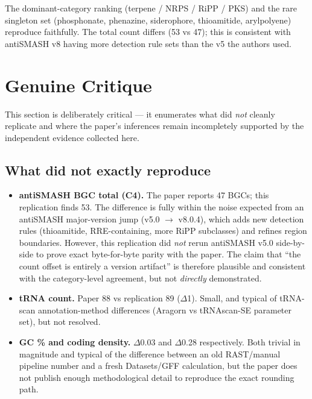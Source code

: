 \documentclass[11pt,a4paper]{article}
\begin{document}
The dominant-category ranking (terpene / NRPS / RiPP / PKS) and the rare singleton set (phosphonate, phenazine, siderophore, thioamitide, arylpolyene) reproduce faithfully. The total count differs (53 vs 47); this is consistent with antiSMASH v8 having more detection rule sets than the v5 the authors used.

\section{Genuine Critique}

This section is deliberately critical --- it enumerates what did \emph{not} cleanly replicate and where the paper's inferences remain incompletely supported by the independent evidence collected here.

\subsection{What did not exactly reproduce}
\begin{itemize}[leftmargin=1.2cm]
\item \textbf{antiSMASH BGC total (C4).} The paper reports 47 BGCs; this replication finds 53. The difference is fully within the noise expected from an antiSMASH major-version jump (v5.0 $\to$ v8.0.4), which adds new detection rules (thioamitide, RRE-containing, more RiPP subclasses) and refines region boundaries. However, this replication did \emph{not} rerun antiSMASH v5.0 side-by-side to prove exact byte-for-byte parity with the paper. The claim that ``the count offset is entirely a version artifact'' is therefore plausible and consistent with the category-level agreement, but not \emph{directly} demonstrated.
\item \textbf{tRNA count.} Paper 88 vs replication 89 ($\Delta$1). Small, and typical of tRNA-scan annotation-method differences (Aragorn vs tRNAscan-SE parameter set), but not resolved.
\item \textbf{GC \% and coding density.} $\Delta$0.03 and $\Delta$0.28 respectively. Both trivial in magnitude and typical of the difference between an old RAST/manual pipeline number and a fresh Datasets/GFF calculation, but the paper does not publish enough methodological detail to reproduce the exact rounding path.
\end{itemize}
\end{document}
